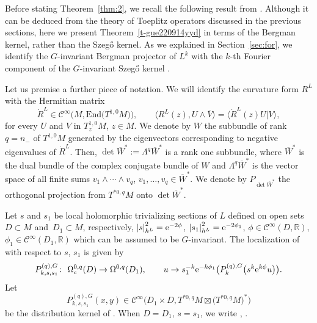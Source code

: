 \documentclass[pdftex]{sigma}
\numberwithin{equation}{section}
\newcommand{\ol}{\overline}
\newcommand{\abs}[1]{\left\vert#1\right\vert}
\newcommand{\To}{\rightarrow}
\begin{document}
 	Before stating Theorem~\ref{thm:2}, we recall the following result from \cite{hsiaohuang}. Although it can be deduced from the theory of Toeplitz operators discussed in the previous sections, here we present Theorem~\ref{t-gue220914yyd} in terms of the Bergman kernel, rather than the Szeg\H{o} kernel. As we explained in Section~\ref{sec:for}, we identify the $G$-invariant Bergman projector  of $L^k$ with the $k$-th Fourier component of the $G$-invariant Szeg\H{o} kernel .
 	
 	Let us premise a further piece of notation. We will identify the curvature form $R^L$ with the Hermitian matrix
 	\[\dot{R}^L\in\mathcal{C}^{\infty}\bigl(M,\mathrm{End}\bigl(T^{1,0}M\bigr)\bigr) , \qquad \big\langle R^L(z) , U\wedge\overline{V} \big\rangle =\big\langle \dot{R}^L(z)U | V \big\rangle,\]
 	for every $U$ and $V$ in $T^{1,0}_zM$, $z\in M$. We denote by $W$ the subbundle of rank $q=n_-$ of $T^{1,0}M$ generated by the eigenvectors corresponding to negative eigenvalues of $\dot{R}^L$. Then, $\det \ol{W}^*:=\Lambda^q\ol{W}^*$ is a rank one subbundle, where $\ol{W}^*$ is the dual bundle of the complex conjugate bundle of $W$ and $\Lambda^q\ol{W}^*$ is the vector space of all finite sums $v_1\wedge\cdots\wedge v_q$, $v_1,\dots,v_q\in\ol{W}^*$. We denote by
 	$P_{\det \ol{W}^*}$ the orthogonal projection from $T^{*0,q}M$ onto $\det \ol{W}^*$.
 	
 	Let $s$ and $s_1$ be local holomorphic trivializing sections of $L$ defined on open sets $D\subset M$ and~${D_1\subset M}$, respectively, $\abs{s}^2_{h^L}={\rm e}^{-2\phi}$, $\abs{s_1}^2_{h^L}={\rm e}^{-2\phi_1}$, $\phi\in\mathcal{C}^\infty(D,\mathbb R)$, $\phi_1\in\mathcal{C}^\infty(D_1,\mathbb R)$ which can be assumed to be $G$-invariant. The localization of  with respect to $s$, $s_1$ is given by
 	\[
 		P^{(q),G}_{k,s,s_1}\colon\ \Omega^{0,q}_c(D)\To\Omega^{0,q}(D_1),\qquad
 		u\To s^{-k}_1{\rm e}^{-k\phi_1}\bigl(P^{(q),G}_k\bigl(s^k{\rm e}^{k\phi}u\bigr)\bigr).
\]
 	Let \[P^{(q),G}_{k,s,s_1}(x,y)\in\mathcal{C}^\infty\bigl(D_1\times D,T^{*0,q}M\boxtimes\bigl(T^{*0,q}M\bigr)^*\bigr)\] be the distribution kernel of . When $D=D_1$, $s=s_1$, we write ,
 	.
 	
\end{document}
